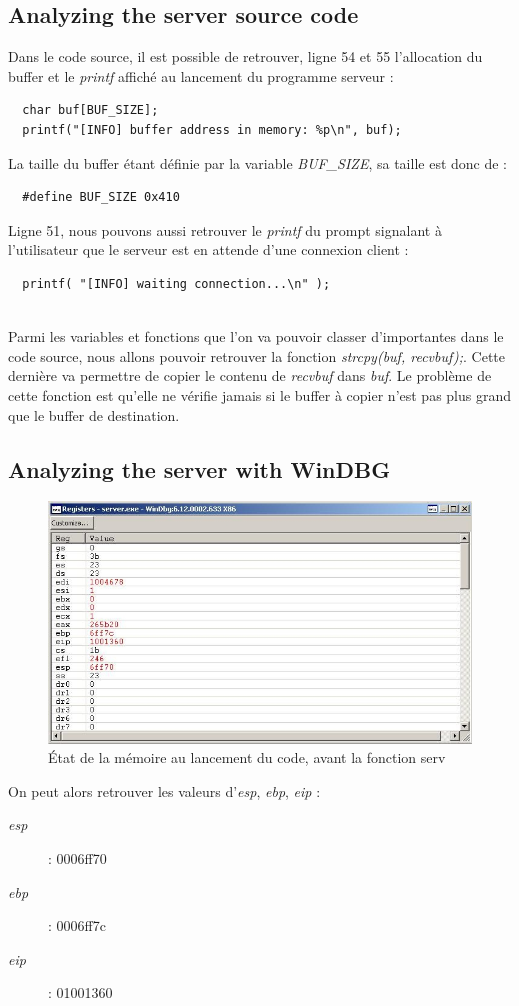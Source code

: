 \subsection{Analyzing the server source code}

Dans le code source, il est possible de retrouver, ligne 54 et 55 l'allocation du buffer et le \textit{printf} affiché au lancement du programme serveur :
\begin{verbatim}
  char buf[BUF_SIZE];
  printf("[INFO] buffer address in memory: %p\n", buf);
\end{verbatim}
La taille du buffer étant définie par la variable \textit{BUF\_SIZE}, sa taille est donc de :
\begin{verbatim}
  #define BUF_SIZE 0x410
\end{verbatim}
Ligne 51, nous pouvons aussi retrouver le \textit{printf} du prompt signalant à l'utilisateur que le serveur est en attende d'une connexion client :
\begin{verbatim}
  printf( "[INFO] waiting connection...\n" );
\end{verbatim}
~\\
Parmi les variables et fonctions que l'on va pouvoir classer d'importantes dans le code source, nous allons pouvoir retrouver la fonction \textit{strcpy(buf, recvbuf);}. Cette dernière va permettre de copier le contenu de \textit{recvbuf} dans \textit{buf}. Le problème de cette fonction est qu'elle ne vérifie jamais si le buffer à copier n'est pas plus grand que le buffer de destination.

\subsection{Analyzing the server with WinDBG}


\begin{figure}[H]
 \centering
 \includegraphics[width=.9\textwidth]{img/41.JPG}
 \caption{État de la mémoire au lancement du code, avant la fonction serv}
\end{figure}
On peut alors retrouver les valeurs d'\textit{esp}, \textit{ebp}, \textit{eip} :
\begin{description}
 \item[\textit{esp}] : 0006ff70
 \item[\textit{ebp}] : 0006ff7c
 \item[\textit{eip}] : 01001360
\end{description}


